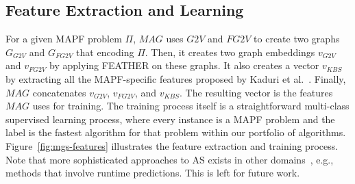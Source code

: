 \documentclass{ecai}
\newcommand{\Carmel}[1]{\textcolor{red}{\textsc{Carmel}: #1}}
\newcommand{\Omri}[1]{}
\newcommand{\gtv}[1]{\ensuremath{\textit{G2V}}\xspace}
\newcommand{\fgtv}[1]{\ensuremath{\textit{FG2V}}\xspace}
\newcommand{\kaduri}[1]{\ensuremath{\textit{KBS}}\xspace}
\newcommand{\mapfgas}[1]{\ensuremath{\textit{MAG}}\xspace}
\begin{document}
\subsection{Feature Extraction and Learning}


For a given MAPF problem $\Pi$, \mapfgas\ uses \gtv\ and \fgtv\ to create two graphs $G_\gtv\ $ and $G_\fgtv\ $ that encoding $\Pi$. 
Then, it creates two graph embeddings $v_\gtv\ $ and $v_\fgtv\ $ by applying FEATHER on these graphs. 
It also creates a vector $v_\kaduri\ $ by extracting all the MAPF-specific features proposed by Kaduri et al.~\cite{kaduri2020algorithm}. 
Finally, \mapfgas\ concatenates 
$v_\gtv\ $, $v_\fgtv\ $, and $v_\kaduri\ $. 
The resulting vector is the features \mapfgas\ uses for training. 
The training process itself is a straightforward multi-class supervised learning process, 
where every instance is a MAPF problem and the label is the fastest algorithm for that problem within our portfolio of algorithms. 
Figure~\ref{fig:mgs-features} illustrates the feature extraction and training process. 
Note that more sophisticated approaches to AS exists in other domains~\cite{kerschke2019automated}, e.g., methods that involve runtime predictions. This is left for future work.  
\end{document}
